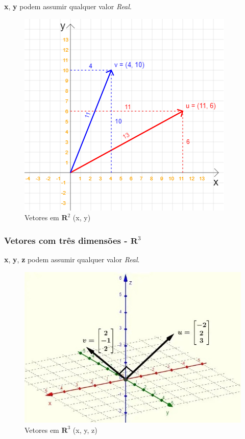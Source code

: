 \documentclass[12pt]{article}
\begin{document}
\textbf{x}, \textbf{y} podem assumir qualquer valor \textit{Real}.

\begin{figure}[H]
	\centering
	\includegraphics[height=.45\textheight]{figuras/vetores_02}
	\caption[Vetores em \( \mathbf{R}^{2} \)]{Vetores em \( \mathbf{R}^{2} \) (x, y)}
	\label{fig:vetores02}
\end{figure}

\newpage

\subsubsection{Vetores com três dimensões - \( \mathbf{R}^{3} \)}

\textbf{x}, \textbf{y}, \textbf{z} podem assumir qualquer valor \textit{Real}.

\begin{figure}[H]
	\centering
	\includegraphics[width=0.5\linewidth]{"figuras/vetores R3"}
	\caption[Vetores em \( \mathbf{R}^{3} \)]{Vetores em \( \mathbf{R}^{3} \) (x, y, z)}
	\label{fig:vetores-r3}
\end{figure}
\end{document}
